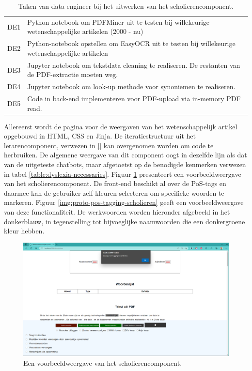 \begin{center}
	\begin{table}[H]
		\begin{tabular}{|m{2cm}|m{12cm}|}
			\hline
			DE1	& Python-notebook om PDFMiner uit te testen bij willekeurige wetenschappelijke artikelen (2000 - nu) \\
			DE2 & Python-notebook opstellen om EasyOCR uit te testen bij willekeurige wetenschappelijke artikelen \\
			DE3 & Jupyter notebook om tekstdata cleaning te realiseren. De restanten van de PDF-extractie moeten weg. \\
			DE4 & Jupyter notebook om look-up methode voor synoniemen te realiseren. \\
			DE5 & Code in back-end implementeren voor PDF-upload via in-memory PDF read. \\
			\hline
		\end{tabular}
		\caption{Taken van data engineer bij het uitwerken van het scholierencomponent.}
		\label{table:tasks-data-engineer-scholars}
	\end{table}
\end{center}

Allereerst wordt de pagina voor de weergaven van het wetenschappelijk artikel opgebouwd in HTML, CSS en Jinja. De iteratiestructuur uit het lerarencomponent, verwezen in \ref{} kan overgenomen worden om code te herbruiken. De algemene weergave van dit component oogt in dezelfde lijn als dat van de uitgeteste chatbots, maar afgetoetst op de benodigde kenmerken verwezen in tabel \ref{table:dyslexia-necessaries}. Figuur \ref{img:proto-homescreen-scholieren} presenteert een voorbeeldweergave van het scholierencomponent. De front-end beschikt al over de PoS-tags en daarmee kan de gebruiker zelf kleuren selecteren om specifieke woorden te markeren. Figuur \ref{img:proto-pos-tagging-scholieren} geeft een voorbeeldweergave van deze functionaliteit. De werkwoorden worden hieronder afgebeeld in het donkerblauw, in tegenstelling tot bijvoeglijke naamwoorden die een donkergroene kleur hebben.

\begin{center}
	\begin{figure}[H]
		\includegraphics[width=\linewidth]{img/proto-melding.png}
		\caption{Een voorbeeldweergave van het scholierencomponent.}
		\label{img:proto-homescreen-scholieren}
	\end{figure}
\end{center}

